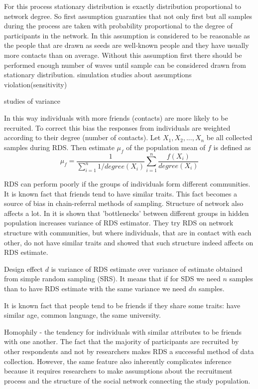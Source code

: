 \documentclass[12pt]{report}
\begin{document}
For this process stationary distribution is exactly distribution proportional to network degree. So first assumption guaranties that not only first but all samples during the process are taken with probability proportional to the degree of participants in the network. In \cite{salganik2004sampling} this assumption is considered to be reasonable as the people that are drawn as seeds are well-known people and they have usually more contacts than on average. Without this assumption first there should be performed enough number of waves until sample can be considered drawn from stationary distribution.
 simulation studies about assumptions violation(sensitivity) \cite{gile2010respondent}

studies of variance

In this way individuals with more friends (contacts) are more likely to be recruited. To correct this bias the responses from individuals are weighted according to their degree (number of contacts).
Let $X_1, X_2, ..., X_n$ be all collected samples during RDS.
Then estimate $\mu_f$ of the population mean of $f$ is defined \cite{goel2010assessing} as
$$\mu_f = \frac{1}{\sum\limits_{i=1}^n 1/degree(X_i)} \sum\limits_{i=1}^n \frac{f(X_i)}{degree(X_i)}$$

RDS can perform poorly if the groups of individuals form different communities. It is known fact that friends tend to have similar traits. This fact becomes a source of bias in chain-referral methods of sampling. Structure of network also affects a lot. In \cite{goel2009respondent} it is shown that 'bottlenecks' between different groups in hidden population increases variance of RDS estimator. They try RDS on network structure with communities, but where individuals, that are in contact with each other, do not have similar traits and showed that such structure indeed affects on RDS estimate. 

Design effect $d$ is variance of RDS estimate over variance of estimate obtained from simple random sampling (SRS). It means that if for SDS we need $n$ samples than to have RDS estimate with the same variance we need $dn$ samples. 

It is known fact that people tend to be friends if they share some traits: have similar age, common language, the same university.

Homophily - the tendency for individuals with similar attributes to be friends with one another.
The fact that the majority of participants are recruited by other respondents and not by researchers makes RDS a successful method of data collection. However, the same feature also inherently complicates inference because it requires researchers to make assumptions about the recruitment
process and the structure of the social network connecting the study population.
\end{document}
